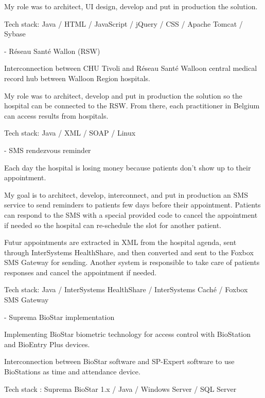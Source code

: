 \begin{cventries}
{My role was to architect, UI design, develop and put in production the solution.

Tech stack: Java / HTML / JavaScript / jQuery / CSS / Apache Tomcat / Sybase

    }
    
    
   
  \cventry
    {-} %
    {Réseau Santé Wallon (RSW)} %
    {} %
    {} %
    {
Interconnection between CHU Tivoli and Réseau Santé Walloon central medical record hub between Walloon Region hospitals.

My role was to architect, develop and put in production the solution so the hospital can be connected to the RSW. From there, each practitioner in Belgium can access results from hospitals.

Tech stack: Java / XML / SOAP / Linux

    }
    
    
   
  \cventry
    {-} %
    {SMS rendezvous reminder} %
    {} %
    {} %
    {
Each day the hospital is losing money because patients don't show up to their appointment.

My goal is to architect, develop, interconnect, and put in production an SMS service to send reminders to patients few days before their appointment. Patients can respond to the SMS with a special provided code to cancel the appointment if needed so the hospital can re-schedule the slot for another patient.

Futur appointments are extracted in XML from the hospital agenda, sent through InterSystems HealthShare, and then converted and sent to the Foxbox SMS Gateway for sending. Another system is responsible to take care of patients responses and cancel the appointment if needed. 

Tech stack: Java / InterSystems HealthShare / InterSystems Caché / Foxbox SMS Gateway

    }
    
    
 
  \cventry
    {-} %
    {Suprema BioStar implementation} %
    {} %
    {} %
    {
Implementing BioStar biometric technology for access control with BioStation and BioEntry Plus devices.

Interconnection between BioStar software and SP-Expert software to use BioStations as time and attendance device. 

Tech stack : Suprema BioStar 1.x / Java / Windows Server / SQL Server
    }

\end{cventries}
